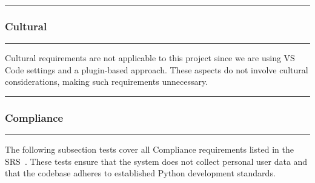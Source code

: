 \documentclass[12pt, titlepage]{article}
\newcommand{\colorrule}{\textcolor{BlueViolet}{\rule{\linewidth}{2pt}}}
\begin{document}
\newpage

  \noindent
  \colorrule

  \subsubsection{Cultural}
  \colorrule

  \medskip

  \noindent
  Cultural requirements are not applicable to this project since we
  are using VS Code settings and a plugin-based approach. These
  aspects do not involve cultural considerations, making such
  requirements unnecessary.

  \noindent
  \colorrule

\subsubsection{Compliance}
\colorrule

\medskip

\noindent
The following subsection tests cover all Compliance requirements listed in the SRS~\cite{SRS}. These tests ensure that the system does not collect personal user data and that the codebase adheres to established Python development standards.
\end{document}
